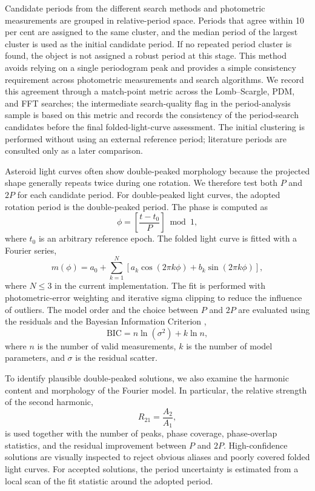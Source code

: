 \documentclass[referee]{raa}
\begin{document}
Candidate periods from the different search methods and photometric measurements are grouped in relative-period space. Periods that agree within 10 per cent are assigned to the same cluster, and the median period of the largest cluster is used as the initial candidate period. If no repeated period cluster is found, the object is not assigned a robust period at this stage. This method avoids relying on a single periodogram peak and provides a simple consistency requirement across photometric measurements and search algorithms. We record this agreement through a match-point metric across the Lomb--Scargle, PDM, and FFT searches; the intermediate search-quality flag in the period-analysis sample is based on this metric and records the consistency of the period-search candidates before the final folded-light-curve assessment. The initial clustering is performed without using an external reference period; literature periods are consulted only as a later comparison.

Asteroid light curves often show double-peaked morphology because the projected shape generally repeats twice during one rotation. We therefore test both \(P\) and \(2P\) for each candidate period. For double-peaked light curves, the adopted rotation period is the double-peaked period. The phase is computed as
\begin{equation}
\phi = \left[\frac{t-t_0}{P}\right]\bmod 1 ,
\end{equation}
where \(t_0\) is an arbitrary reference epoch. The folded light curve is fitted with a Fourier series,
\begin{equation}
m(\phi)=a_0+\sum_{k=1}^{N}\left[a_k\cos(2\pi k\phi)+b_k\sin(2\pi k\phi)\right],
\end{equation}
where \(N\leq3\) in the current implementation. The fit is performed with photometric-error weighting and iterative sigma clipping to reduce the influence of outliers. The model order and the choice between \(P\) and \(2P\) are evaluated using the residuals and the Bayesian Information Criterion \citep{Schwarz1978},
\begin{equation}
\mathrm{BIC}=n\ln(\sigma^2)+k\ln n ,
\end{equation}
where \(n\) is the number of valid measurements, \(k\) is the number of model parameters, and \(\sigma\) is the residual scatter.

To identify plausible double-peaked solutions, we also examine the harmonic content and morphology of the Fourier model. In particular, the relative strength of the second harmonic,
\begin{equation}
R_{21}=\frac{A_2}{A_1},
\end{equation}
is used together with the number of peaks, phase coverage, phase-overlap statistics, and the residual improvement between \(P\) and \(2P\). High-confidence solutions are visually inspected to reject obvious aliases and poorly covered folded light curves. For accepted solutions, the period uncertainty is estimated from a local scan of the fit statistic around the adopted period.
\end{document}
